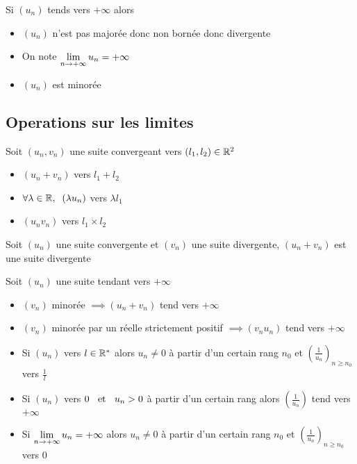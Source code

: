\begin{rem}
Si $(u_n)$ tends vers $+\infty$ alors
\begin{itemize}
    \item $(u_n)$ n'est pas majorée donc non bornée donc divergente
    \item On note $\lim\limits_{n \to +\infty} u_n = +\infty$
    \item $(u_n)$ est minorée
\end{itemize}
\end{rem}

\subsection{Operations sur les limites}

\begin{prp}
Soit $(u_n, v_n)$ une suite convergeant vers $(l_1, l_2) \in \mathbb{R}^2$
\begin{itemize}
    \item $(u_n + v_n)$ \cv vers $l_1 + l_2$
    \item $\forall \lambda \in \mathbb{R}, \;\; (\lambda u_n)$
    \cv vers $\lambda l_1$
    \item $(u_n v_n)$ \cv vers $l_1 \times l_2$
\end{itemize}
\end{prp}

\begin{rem}
Soit $(u_n)$ une suite convergente et $(v_n)$ une suite divergente,
$(u_n + v_n)$ est une suite divergente
\end{rem}

\begin{prp}
Soit $(u_n)$ une suite tendant vers $+\infty$
\begin{itemize}
    \item $(v_n)$ minorée $\implies (u_n + v_n)$ tend vers $+\infty$
    \item $(v_n)$ minorée par un réelle strictement positif
    $\implies (v_n u_n)$ tend vers $+\infty$
\end{itemize}
\end{prp}

\begin{prp}
\begin{itemize}
    \item Si $(u_n)$ \cv vers $l \in \mathbb{R}^*$ alors $u_n \neq 0$ à partir
    d'un certain rang $n_0$ et $\left(\frac{1}{u_n}\right)_{n \geq n_0}$ \cv vers
    $\frac{1}{l}$
    \item Si $(u_n)$ \cv vers $0 \;\;\text{ et }\;\; u_n > 0$ à partir d'un certain rang
    alors $\left(\frac{1}{u_n}\right)$ tend vers $+\infty$
    \item Si $\lim\limits_{n \to +\infty} u_n = +\infty$ alors $u_n \neq 0$ à partir d'un
    certain rang $n_0$ et $\left(\frac{1}{u_n}\right)_{n \geq n_0}$ \cv vers 0
\end{itemize}
\end{prp}

